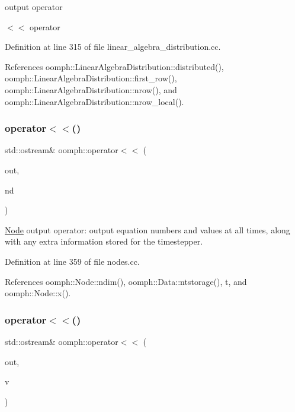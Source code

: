 output operator 

$<$$<$ operator 

Definition at line 315 of file linear\+\_\+algebra\+\_\+distribution.\+cc.



References oomph\+::\+Linear\+Algebra\+Distribution\+::distributed(), oomph\+::\+Linear\+Algebra\+Distribution\+::first\+\_\+row(), oomph\+::\+Linear\+Algebra\+Distribution\+::nrow(), and oomph\+::\+Linear\+Algebra\+Distribution\+::nrow\+\_\+local().

\mbox{\label{namespaceoomph_a55dc637c1a3983a8a46415846cc821d7}} 
\subsubsection{\texorpdfstring{operator$<$$<$()}{operator<<()}\hspace{0.1cm}{\footnotesize\ttfamily [2/3]}}
{\footnotesize\ttfamily std\+::ostream\& oomph\+::operator$<$$<$ (\begin{DoxyParamCaption}\item[{std\+::ostream \&}]{out,  }\item[{const \hyperlink{classoomph_1_1Node}{Node} \&}]{nd }\end{DoxyParamCaption})}

\hyperlink{classoomph_1_1Node}{Node} output operator\+: output equation numbers and values at all times, along with any extra information stored for the timestepper. 

Definition at line 359 of file nodes.\+cc.



References oomph\+::\+Node\+::ndim(), oomph\+::\+Data\+::ntstorage(), t, and oomph\+::\+Node\+::x().

\mbox{\label{namespaceoomph_aa7525c5465ee2c4398c37072773f2299}} 
\subsubsection{\texorpdfstring{operator$<$$<$()}{operator<<()}\hspace{0.1cm}{\footnotesize\ttfamily [3/3]}}
{\footnotesize\ttfamily std\+::ostream\& oomph\+::operator$<$$<$ (\begin{DoxyParamCaption}\item[{std\+::ostream \&}]{out,  }\item[{const \hyperlink{classoomph_1_1DoubleVector}{Double\+Vector} \&}]{v }\end{DoxyParamCaption})}



